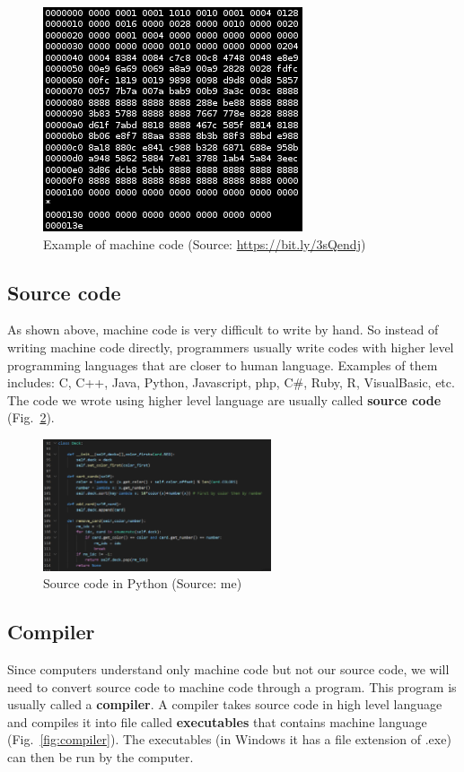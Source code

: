 \documentclass[a4paper,12pt]{article}
\begin{document}
\begin{figure}[h]
    \centering
    \includegraphics{img/machin-code.png}
    \caption{Example of machine code (Source: \href{https://bit.ly/3sQendj}{https://bit.ly/3sQendj})}
    \label{fig:machine_code}
\end{figure}

\subsection{Source code}
As shown above, machine code is very difficult to write by hand. So instead of writing machine code directly, programmers usually write codes with higher level programming languages that are closer to human language. Examples of them includes: C, C++, Java, Python, Javascript, php, C\#, Ruby, R, VisualBasic, etc. The code we wrote using higher level language are usually called \textbf{source code} (Fig.~\ref{fig:source_code_python}).
\begin{figure}[h]
    \centering
    \includegraphics[width=0.6\textwidth]{img/python-code.PNG}
    \caption{Source code in Python (Source: me)}
    \label{fig:source_code_python}
\end{figure}

\subsection{Compiler}
Since computers understand only machine code but not our source code, we will need to convert source code to machine code through a program. This program is usually called a \textbf{compiler}. A compiler takes source code in high level language and compiles it into file called \textbf{executables} that contains machine language (Fig.~\ref{fig:compiler}). The executables (in Windows it has a file extension of .exe) can then be run by the computer.
\end{document}
